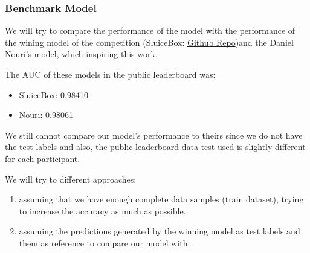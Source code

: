 \documentclass[]{article}
\begin{document}

\subsubsection{Benchmark Model}\label{benchmark-model}

We will try to compare the performance of the model with the performance of the wining model of the competition  (SluiceBox:  \href{https://github.com/nmkridler/moby}{Github Repo})and the Daniel Nouri's model, which inspiring this work.

The AUC of these models in the public leaderboard was:
\begin{itemize}
	\item SluiceBox: 0.98410
	\item Nouri: 0.98061 
\end{itemize}

We still cannot compare our model's performance to theirs since we do not have the test labels and also, the public leaderboard data test used is slightly different for each participant.

We will try to different approaches:
\begin{enumerate}
	\item assuming that we have enough complete data samples (train dataset), trying to increase the accuracy as much as possible. 
	\item assuming the predictions generated by the winning model as test labels and them as reference to compare our model with. 
\end{enumerate}
\end{document}
